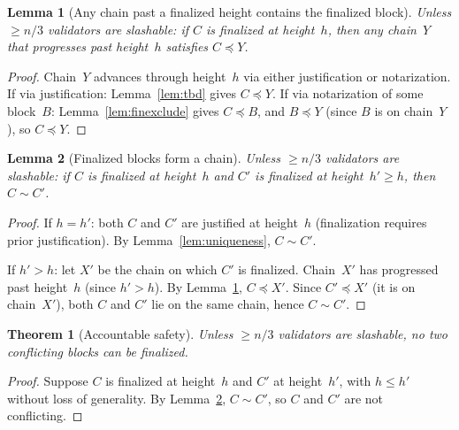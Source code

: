 \documentclass{article}
\theoremstyle{plain}
\newtheorem{theorem}{Theorem}
\newtheorem{lemma}{Lemma}
\theoremstyle{definition}
\theoremstyle{remark}
\begin{document}
\begin{lemma}[Any chain past a finalized height contains the finalized block]\label{lem:mainsafety}
Unless $\geq n/3$ validators are slashable: if $C$ is finalized at height~$h$, then any chain~$Y$ that progresses past height~$h$ satisfies $C \preceq Y$.
\end{lemma}

\begin{proof}
Chain~$Y$ advances through height~$h$ via either justification or notarization.
If via justification: Lemma~\ref{lem:tbd} gives $C \preceq Y$.
If via notarization of some block~$B$: Lemma~\ref{lem:finexclude} gives $C \preceq B$, and $B \preceq Y$ (since $B$ is on chain~$Y$), so $C \preceq Y$.
\end{proof}

\begin{lemma}[Finalized blocks form a chain]\label{lem:finchain}
Unless $\geq n/3$ validators are slashable: if $C$ is finalized at height~$h$ and $C'$ is finalized at height~$h' \geq h$, then $C \sim C'$.
\end{lemma}

\begin{proof}
If $h = h'$: both $C$ and $C'$ are justified at height~$h$ (finalization requires prior justification).
By Lemma~\ref{lem:uniqueness}, $C \sim C'$.

If $h' > h$: let $X'$ be the chain on which $C'$ is finalized.
Chain~$X'$ has progressed past height~$h$ (since $h' > h$).
By Lemma~\ref{lem:mainsafety}, $C \preceq X'$.
Since $C' \preceq X'$ (it is on chain~$X'$), both $C$ and $C'$ lie on the same chain, hence $C \sim C'$.
\end{proof}

\begin{theorem}[Accountable safety]\label{thm:safety}
Unless $\geq n/3$ validators are slashable, no two conflicting blocks can be finalized.
\end{theorem}

\begin{proof}
Suppose $C$ is finalized at height~$h$ and $C'$ at height~$h'$, with $h \leq h'$ without loss of generality.
By Lemma~\ref{lem:finchain}, $C \sim C'$, so $C$ and $C'$ are not conflicting.
\end{proof}
\end{document}
